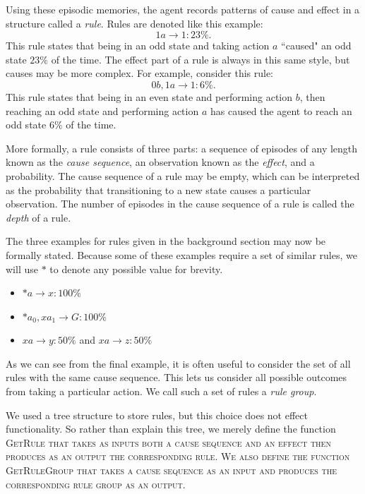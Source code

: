 \documentclass[letterpaper]{article} %
\begin{document}
Using these episodic memories, the agent records patterns of cause and effect in a structure called a \textit{rule}. Rules are denoted like this example: $$1a \rightarrow 1: 23\%.$$ This rule states that being in an odd state and taking action $a$ ``caused" an odd state $23\%$ of the time. The effect part of a rule is always in this same style, but causes may be more complex. For example, consider this rule: $$0b,1a \rightarrow 1: 6\%.$$ 
This rule states that being in an even state and performing action $b$, then reaching an odd state and performing action $a$ has caused the agent to reach an odd state $6\%$ of the time.

More formally, a rule consists of three parts: a sequence of episodes of any length known as the \emph{cause sequence}, an observation known as the \emph{effect}, and a probability. The cause sequence of a rule may be empty, which can be interpreted as the probability  that transitioning to a new state causes a particular observation. The number of episodes in the cause sequence of a rule is called the \textit{depth} of a rule.

The three examples for rules given in the background section may now be formally stated. Because some of these examples require a set of similar rules, we will use $*$ to denote any possible value for brevity.
\begin{itemize}
	\item $*a \rightarrow x: 100\%$
	\item $*a_0, xa_1 \rightarrow G: 100\%$
	\item $xa \rightarrow y: 50\%$ and $xa \rightarrow z: 50\%$
\end{itemize}
As we can see from the final example, it is often useful to consider the set of all rules with the same cause sequence. This lets us consider all possible outcomes from taking a particular action. We call such a set of rules a \textit{rule group}.

We used a tree structure to store rules, but this choice does not effect functionality. So rather than explain this tree, we merely define the function \scshape GetRule \normalfont that takes as inputs both a cause sequence and an effect then produces as an output the corresponding rule. We also define the function \scshape GetRuleGroup \normalfont that takes  a cause sequence as an input and produces the corresponding rule group as an output.
\end{document}
